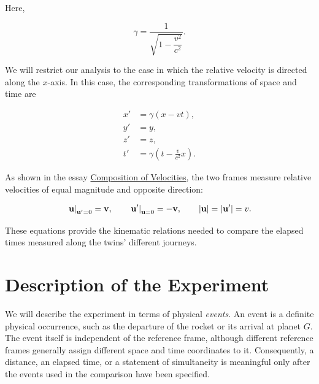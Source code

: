 \documentclass[12pt]{article}
\begin{document}
Here,

\begin{equation}
  \gamma
  =
  \frac{1}{\sqrt{1-\dfrac{v^2}{c^2}}}.
  \label{eq:Lorentz_factor}
\end{equation}

We will restrict our analysis to the case in which the relative velocity is directed along the
$x$-axis. In this case, the corresponding transformations of space and time are

\begin{equation}
  \begin{aligned}
    x' &= \gamma(x-vt), \\
    y' &= y, \\
    z' &= z, \\
    t' &= \gamma\!\left(t-\frac{v}{c^2}x\right).
  \end{aligned}
  \label{eq:Lorentz_transformation_along_x}
\end{equation}

As shown in the essay
\href{/physics/relativity/special-relativity/composition-of-velocities}{Composition of Velocities},
the two frames measure relative velocities of equal magnitude and opposite direction:

\begin{equation}
  \left.\vb{u}\right|_{\vb{u}'=0}=\vb{v},
  \qquad
  \left.\vb{u}'\right|_{\vb{u}=0}=-\vb{v},
  \qquad
  |\vb{u}|=|\vb{u}'|=v.
  \label{eq:reciprocal_relative_velocities}
\end{equation}

These equations provide the kinematic relations needed to compare the elapsed times measured
along the twins' different journeys.

\section{Description of the Experiment}

We will describe the experiment in terms of physical \textit{events}. An event is a definite
physical occurrence, such as the departure of the rocket or its arrival at planet $G$. The event
itself is independent of the reference frame, although different reference frames generally assign
different space and time coordinates to it. Consequently, a distance, an elapsed time, or a
statement of simultaneity is meaningful only after the events used in the comparison have been
specified. \par
\end{document}
